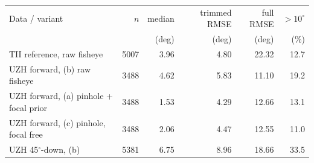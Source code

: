 \footnotesize
\begin{tabular}{lrrrrr}
\toprule
Data / variant & $n$ & median & trimmed RMSE & full RMSE & $>10^\circ$ \\
 & & (deg) & (deg) & (deg) & (\%) \\
\midrule
TII reference, raw fisheye & 5007 & 3.96 & 4.80 & 22.32 & 12.7 \\
\midrule
UZH forward, (b) raw fisheye & 3488 & 4.62 & 5.83 & 11.10 & 19.2 \\
UZH forward, (a) pinhole + focal prior & 3488 & 1.53 & 4.29 & 12.66 & 13.1 \\
UZH forward, (c) pinhole, focal free & 3488 & 2.06 & 4.47 & 12.55 & 11.0 \\
\midrule
UZH 45$^\circ$-down, (b) & 5381 & 6.75 & 8.96 & 18.66 & 33.5 \\
\bottomrule
\end{tabular}

